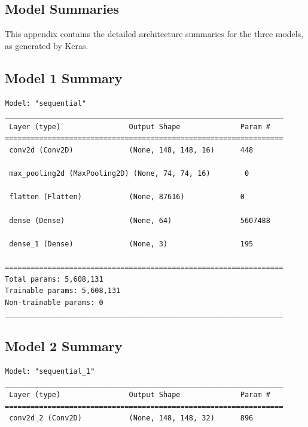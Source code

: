 \documentclass[pdflatex,sn-mathphys-num]{sn-jnl}%
\theoremstyle{thmstyleone}%
\theoremstyle{thmstyletwo}%
\theoremstyle{thmstylethree}%
\begin{document}
\backmatter

\begin{appendices}

\section{Model Summaries}\label{secA1}

This appendix contains the detailed architecture summaries for the three models, as generated by Keras.

\subsection{Model 1 Summary}
\begin{verbatim}
Model: "sequential"
_________________________________________________________________
 Layer (type)                Output Shape              Param #   
=================================================================
 conv2d (Conv2D)             (None, 148, 148, 16)      448       
                                                                 
 max_pooling2d (MaxPooling2D) (None, 74, 74, 16)        0         
                                                                 
 flatten (Flatten)           (None, 87616)             0         
                                                                 
 dense (Dense)               (None, 64)                5607488   
                                                                 
 dense_1 (Dense)             (None, 3)                 195       
                                                                 
=================================================================
Total params: 5,608,131
Trainable params: 5,608,131
Non-trainable params: 0
_________________________________________________________________
\end{verbatim}

\subsection{Model 2 Summary}
\begin{verbatim}
Model: "sequential_1"
_________________________________________________________________
 Layer (type)                Output Shape              Param #   
=================================================================
 conv2d_2 (Conv2D)           (None, 148, 148, 32)      896       
                                                                 

\end{verbatim}
\end{appendices}
\end{document}

